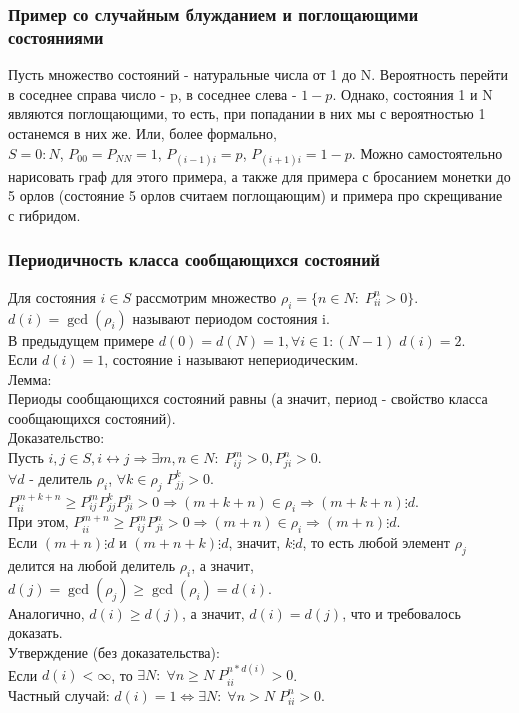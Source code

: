 \subsubsection{Пример со случайным блужданием и поглощающими состояниями}
Пусть множество состояний - натуральные числа от 1 до N. Вероятность перейти в соседнее справа число - p, в соседнее слева - $1 - p$. Однако, состояния 1 и N являются поглощающими, то есть, при попадании в них мы с вероятностью 1 останемся в них же. Или, более формально,\\
$S = 0:N$, $P_{00} = P_{NN} = 1$, $P_{(i - 1)i} = p$, $P_{(i + 1)i} = 1 - p$.
Можно самостоятельно нарисовать граф для этого примера, а также для примера с бросанием монетки до 5 орлов (состояние 5 орлов считаем поглощающим) и примера про скрещивание с гибридом.
\subsubsection{Периодичность класса сообщающихся состояний}
Для состояния $i \in S$ рассмотрим множество $\rho_i = \{n \in N: \; P^n_{ii} > 0\}$.\\
$d(i) = \gcd(\rho_i)$ называют периодом состояния i.\\
В предыдущем примере $d(0) = d(N) = 1, \forall i \in 1:(N - 1) \; d(i) = 2$.\\
Если $d(i) = 1$, состояние i называют непериодическим.\\
Лемма:\\
Периоды сообщающихся состояний равны (а значит, период - свойство класса сообщающихся состояний).\\
Доказательство:\\
Пусть $i, j \in S, i \leftrightarrow j \Rightarrow \exists m, n \in N: \; P^m_{ij} > 0, P^n_{ji} > 0$.\\
$\forall d$ - делитель $\rho_i$, $\forall k \in \rho_j \; P^k_{jj} > 0$.\\
$P^{m + k + n}_{ii} \geq P^m_{ij}P^k_{jj}P^n_{ji} > 0 \Rightarrow (m + k + n) \in \rho_i \Rightarrow (m + k + n) \vdots d$.\\
При этом, $P^{m + n}_{ii} \geq P^m_{ij}P^n_{ji} > 0 \Rightarrow (m + n) \in \rho_i \Rightarrow (m + n) \vdots d$.\\
Если $(m + n) \vdots d$ и $(m + n + k) \vdots d$, значит, $k \vdots d$, то есть любой элемент $\rho_j$ делится на любой делитель $\rho_i$, а значит, $d(j) = \gcd(\rho_j) \geq \gcd(\rho_i) = d(i)$.\\
Аналогично, $d(i) \geq d(j)$, а значит, $d(i) = d(j)$, что и требовалось доказать.\\
Утверждение (без доказательства):\\
Если $d(i) < \infty$, то $\exists N: \; \forall n \geq N \; P^{n * d(i)}_{ii} > 0$.\\
Частный случай: $d(i) = 1 \Leftrightarrow \exists N: \; \forall n > N \; P^n_{ii} > 0$.
